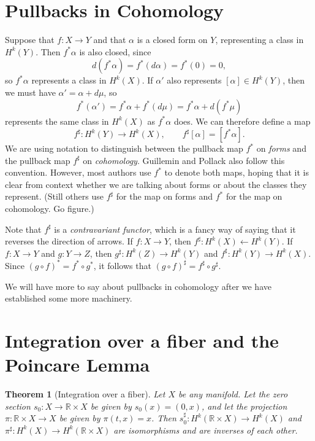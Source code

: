 \documentclass[12pt]{amsbook}
\newcommand{\R}{{\mathbb R}}
\newtheorem{thm}{Theorem}[section]
\theoremstyle{definition}
\begin{document}
\section{Pullbacks in Cohomology}

Suppose that $f: X \to Y$ and that $\alpha$ is a closed form on $Y$, 
representing a class in $H^k(Y)$. Then $f^*\alpha$ is also closed, since 
$$ d(f^*\alpha) = f^*(d\alpha) = f^*(0)=0,$$
so $f^*\alpha$ represents a class in $H^k(X)$. If $\alpha'$ also 
represents $[\alpha] \in H^k(Y)$, then we must have $\alpha'=\alpha+d\mu$, so
$$ f^*(\alpha') = f^*\alpha + f^*(d\mu) = f^*\alpha + d(f^*\mu)$$
represents the same class in $H^k(X)$ as $f^*\alpha$ does. We can therefore
define a map 
$$f^\sharp: H^k(Y) \to H^k(X), \qquad f^\sharp[\alpha] = [f^*\alpha].$$
We are using notation to distinguish between the pullback map $f^*$ on 
{\em forms} and the pullback map $f^\sharp$ on {\em cohomology}. Guillemin
and Pollack also follow this convention. However, most authors use 
$f^*$ to denote both maps, hoping that it is clear from context whether 
we are talking about forms or about the classes they represent.  (Still others
use $f^\sharp$ for the map on forms and $f^*$ for the map on cohomology.
Go figure.) 

Note that $f^\sharp$ is a {\em contravariant functor}, which is a fancy way
of saying that it reverses the direction of arrows. If $f: X \to Y$, then
$f^\sharp: H^k(X) \leftarrow H^k(Y)$. If $f: X \to Y$ and $g: Y \to Z$, then
$g^\sharp: H^k(Z) \to H^k(Y)$ and $f^\sharp: H^k(Y) \to H^k(X)$. Since 
$(g \circ f)^* = f^* \circ g^*$, it follows that 
$(g \circ f)^\sharp = f^\sharp \circ g^\sharp$. 

We will have more to say about pullbacks in cohomology after we have established
some more machinery.

\section{Integration over a fiber and the 
Poincare Lemma}

\begin{thm}[Integration over a fiber] Let $X$ be any manifold.
Let the {\em zero section} $s_0:X \to \R \times X$ be given by $s_0(x)=(0,x)$,
and let the {\em projection} $\pi: \R \times X \to X$ be given 
by $\pi(t,x)=x$. Then
$s_0^\sharp: H^k(\R \times X) \to H^k(X)$ and 
$\pi^\sharp: H^k(X) \to H^k(\R \times X)$ are isomorphisms
and are inverses of each other. 
\end{thm}
\end{document}
